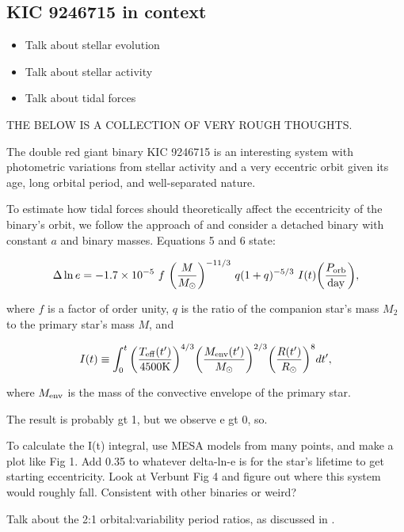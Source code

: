 \subsection{KIC 9246715 in context}\label{context}
\begin{itemize}
\item Talk about stellar evolution
\item Talk about stellar activity
\item Talk about tidal forces
\end{itemize}

THE BELOW IS A COLLECTION OF VERY ROUGH THOUGHTS.

The double red giant binary KIC 9246715 is an interesting system with photometric variations from stellar activity and a very eccentric orbit given its age, long orbital period, and well-separated nature.

To estimate how tidal forces should theoretically affect the eccentricity of the binary's orbit, we follow the approach of \citet{ver95} and consider a detached binary with constant $a$ and binary masses. Equations 5 and 6 \citep{ver95} state:

\begin{equation}\label{tide1}
\Delta \ln e = -1.7 \times 10^{-5} \ f \ {\left( \frac{M}{M_{\odot}} \right)}^{-11/3} \ q(1+q)^{-5/3} \ I(t) {\left( \frac{P_{\rm{orb}}}{\rm{day}} \right)},
\end{equation}

where $f$ is a factor of order unity, $q$ is the ratio of the companion star's mass $M_2$ to the primary star's mass $M$, and

\begin{equation}
I(t) \equiv \int_0^t {\left( \frac{T_{\rm{eff}}(t')}{4500 \rm{K}} \right)}^{4/3} {\left( \frac{M_{\rm{env}}(t')}{M_{\odot}} \right)}^{2/3} {\left( \frac{R(t')}{R_{\odot}} \right)}^8 dt',
\end{equation}

where $M_{\rm{env}}$ is the mass of the convective envelope of the primary star.

The result is probably gt 1, but we observe e gt 0, so.

To calculate the I(t) integral, use MESA models from many points, and make a plot like Fig 1.
Add 0.35 to whatever delta-ln-e is for the star's lifetime to get starting eccentricity.
Look at Verbunt Fig 4 and figure out where this system would roughly fall. Consistent with other binaries or weird?

Talk about the 2:1 orbital:variability period ratios, as discussed in \citet{gau14}.

